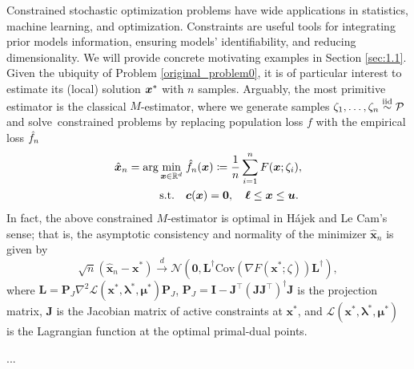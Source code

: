 \documentclass[aos]{imsart}
\numberwithin{equation}{section}
\theoremstyle{plain}
\begin{document}
Constrained stochastic optimization problems have wide applications in statistics, machine learning, and optimization. Constraints are useful tools for integrating prior models information, ensuring models' identifiability, and reducing dimensionality. We will provide concrete motivating examples in Section \ref{sec:1.1}. Given the ubiquity of Problem \eqref{original_problem0}, it is of particular interest to estimate its (local) solution $\tx$ with $n$ samples. Arguably, the most primitive estimator is the classical $M$-estimator, where we generate samples $\zeta_1,\ldots,\zeta_n\stackrel{\text{iid}}{\sim} \P$ and solve~constrained problems by replacing population loss $f$ with the empirical loss $\hf_n$
\begin{equation*}
	\begin{split}
		\hx_n  = \arg\min_{\bx\in\mR^d}\; & \hf_n(\bx)\coloneqq \frac{1}{n}\sum_{i=1}^{n} F(\bx;\zeta_i),\\
		\text{s.t.} \hspace{1em} & \bm{c}(\bm{x}) = \bm{0},\quad \bm{\ell} \leq \bm{x} \leq \bm{u}.
	\end{split}
\end{equation*}
In fact, the above constrained $M$-estimator is optimal in  H\'ajek and Le Cam's sense; that is, the asymptotic consistency and normality of the minimizer $\hat{\bm{x}}_{n}$ is given by 
\begin{equation*}
    \sqrt{n} \left( \hat{\bm{x}}_{n} - \bm{x}^{*} \right) \stackrel{d}{\longrightarrow} \mathcal{N} \left( \bm{0}, \bm{L}^{\dag} \text{Cov}\left( \nabla F(\bm{x}^{*};\zeta) \right) \bm{L}^{\dag}\right),
\end{equation*}
where $\bm{L} = \bm{P}_{J} \nabla^2 \mathcal{L}(\bm{x}^{*},\bm{\lambda}^{*},\bm{\mu}^{*})\bm{P}_{J}$, $\bm{P}_{J} = \bm{I} - \bm{J}^{\top}\left( \bm{J}\bm{J}^{\top}\right)^{\dag}\bm{J}$ is the projection matrix, $\bm{J}$ is the Jacobian matrix of active constraints at $\bm{x}^{*}$, and $\mathcal{L}(\bm{x}^{*},\bm{\lambda}^{*},\bm{\mu}^{*})$ is the Lagrangian function at the optimal primal-dual points. 



...
\end{document}
